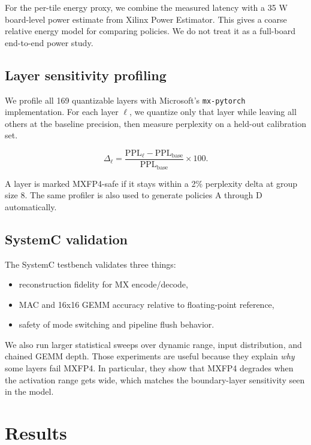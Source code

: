 \documentclass[11pt,a4paper]{article}
\begin{document}
For the per-tile energy proxy, we combine the measured latency with a 35 W board-level power estimate from Xilinx Power Estimator. This gives a coarse relative energy model for comparing policies. We do not treat it as a full-board end-to-end power study.

\subsection{Layer sensitivity profiling}

We profile all 169 quantizable layers with Microsoft's \texttt{mx-pytorch} implementation. For each layer $\ell$, we quantize only that layer while leaving all others at the baseline precision, then measure perplexity on a held-out calibration set.

\[
\Delta_\ell = \frac{\mathrm{PPL}_\ell - \mathrm{PPL}_{\mathrm{base}}}{\mathrm{PPL}_{\mathrm{base}}} \times 100.
\]

A layer is marked MXFP4-safe if it stays within a 2\% perplexity delta at group size 8. The same profiler is also used to generate policies A through D automatically.

\subsection{SystemC validation}

The SystemC testbench validates three things:

\begin{itemize}    \item reconstruction fidelity for MX encode/decode,
    \item MAC and 16x16 GEMM accuracy relative to floating-point reference,
    \item safety of mode switching and pipeline flush behavior.
\end{itemize}

We also run larger statistical sweeps over dynamic range, input distribution, and chained GEMM depth. Those experiments are useful because they explain \emph{why} some layers fail MXFP4. In particular, they show that MXFP4 degrades when the activation range gets wide, which matches the boundary-layer sensitivity seen in the model.


\section{Results}
\end{document}
